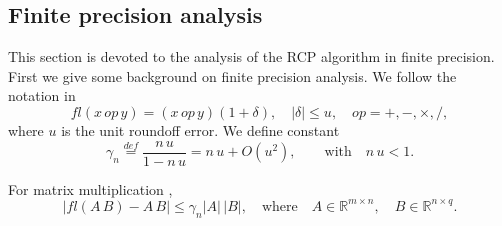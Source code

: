\documentclass[11pt]{article}
\begin{document}
\subsection{Finite precision analysis}
This section is devoted to the analysis of the RCP algorithm in finite precision. First we give some background on finite precision analysis. We follow the notation in \cite{higham2002accuracy}
\begin{equation*}
    fl(x \, op \, y) = (x \, op \, y)(1+\delta), \quad |\delta| \le u, \quad op = +,-,\times, /,
\end{equation*}
where $u$ is the unit roundoff error. We define constant
\begin{equation*}
    \gamma_n \stackrel{def}{=} \frac{n \, u}{1 - n \, u} = n \, u + O(u^2), \qquad \mbox{with} \quad n \, u < 1.
\end{equation*}

For matrix multiplication \cite{higham2002accuracy},
\begin{equation*}
    \left| fl(A \, B) - A \,B \right| \le \gamma_n |A| \, |B|, \quad \mbox{where} \quad A \in \mathbb{R}^{m \times n}, \quad B \in \mathbb{R}^{n\times q}.
\end{equation*}
\end{document}
